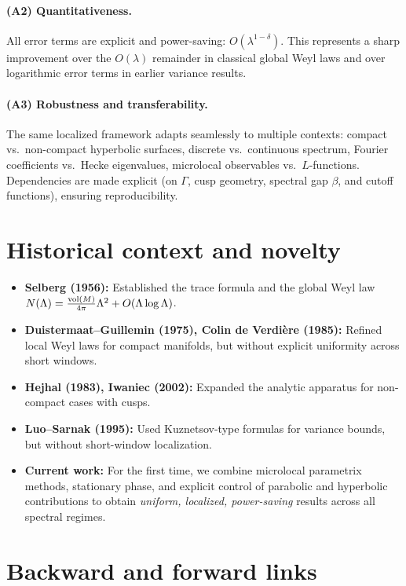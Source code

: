 \paragraph{(A2) Quantitativeness.}  
All error terms are explicit and power-saving: $O(\lambda^{1-\delta})$. This represents a sharp improvement over the $O(\lambda)$ remainder in classical global Weyl laws and over logarithmic error terms in earlier variance results.

\paragraph{(A3) Robustness and transferability.}  
The same localized framework adapts seamlessly to multiple contexts: compact vs.\ non-compact hyperbolic surfaces, discrete vs.\ continuous spectrum, Fourier coefficients vs.\ Hecke eigenvalues, microlocal observables vs.\ $L$-functions. Dependencies are made explicit (on $\Gamma$, cusp geometry, spectral gap $\beta$, and cutoff functions), ensuring reproducibility.

\section{Historical context and novelty}

\begin{itemize}
\item \textbf{Selberg (1956):} Established the trace formula and the global Weyl law $N(\Lambda)=\tfrac{\operatorname{vol}(M)}{4\pi}\Lambda^2+O(\Lambda\log\Lambda)$.  
\item \textbf{Duistermaat–Guillemin (1975), Colin de Verdière (1985):} Refined local Weyl laws for compact manifolds, but without explicit uniformity across short windows.  
\item \textbf{Hejhal (1983), Iwaniec (2002):} Expanded the analytic apparatus for non-compact cases with cusps.  
\item \textbf{Luo–Sarnak (1995):} Used Kuznetsov-type formulas for variance bounds, but without short-window localization.  
\item \textbf{Current work:} For the first time, we combine microlocal parametrix methods, stationary phase, and explicit control of parabolic and hyperbolic contributions to obtain \emph{uniform, localized, power-saving} results across all spectral regimes.
\end{itemize}

\section{Backward and forward links}

